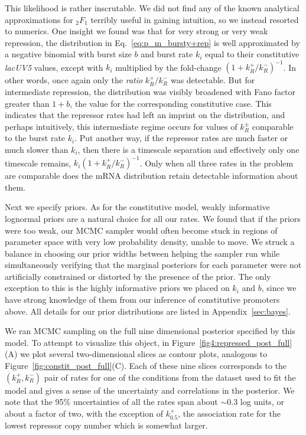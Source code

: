 This likelihood is rather inscrutable. We did not find any of the known
analytical approximations for ${_2F_1}$ terribly useful in gaining intuition, so
we instead resorted to numerics. One insight we found
was that for very strong or very weak repression, the distribution in
Eq.~\ref{eq:p_m_bursty+rep} is well approximated by a negative binomial with
burst size $b$ and burst rate $k_i$ equal to their constitutive \textit{lacUV5}
values, except with $k_i$ multiplied by the fold-change
$\left(1+k_R^+/k_R^-\right)^{-1}$. In other words, once again only the
\textit{ratio} $k_R^+/k_R^-$ was detectable. But for intermediate repression,
the distribution was visibly broadened with Fano factor greater than $1+b$, the
value for the corresponding constitutive case. This indicates that the repressor
rates had left an imprint on the distribution, and perhaps intuitively, this
intermediate regime occurs for values of $k_R^\pm$ comparable to the burst rate
$k_i$. Put another way, if the repressor rates are much faster or much slower
than $k_i$, then there is a timescale separation and effectively only one
timescale remains, $k_i\left(1+k_R^+/k_R^-\right)^{-1}$. Only when all three
rates in the problem are comparable does the mRNA distribution retain detectable
information about them.

Next we specify priors. As for the constitutive model, weakly informative
lognormal priors are a natural choice for all our rates. We found that if the
priors were too weak, our MCMC sampler would often become stuck in regions of
parameter space with very low probability density, unable to move. We struck a
balance in choosing our prior widths between helping the sampler run while
simultaneously verifying that the marginal posteriors for each parameter were
not artificially constrained or distorted by the presence of the prior. The only
exception to this is the highly informative priors we placed on $k_i$ and $b$,
since we have strong knowledge of them from our inference of constitutive
promoters above. All details for our prior distributions are listed in 
Appendix~\ref{sec:bayes}.

We ran MCMC sampling on the full nine dimensional posterior specified by this
model. To attempt to visualize this object, in
Figure~\ref{fig4:repressed_post_full}(A) we plot several two-dimensional slices
as contour plots, analogous to Figure~\ref{fig:constit_post_full}(C). Each of
these nine slices corresponds to the $(k_R^+, k_R^-)$ pair of rates for one of
the conditions from the dataset used to fit the model and gives a
sense of the uncertainty and correlations in the posterior.
We note that the 95\% uncertainties of all the rates span about $\sim0.3$
log units, or about a factor of two, with the exception of $k_{0.5}^+$, the
association rate for the lowest repressor copy number which is somewhat larger.

